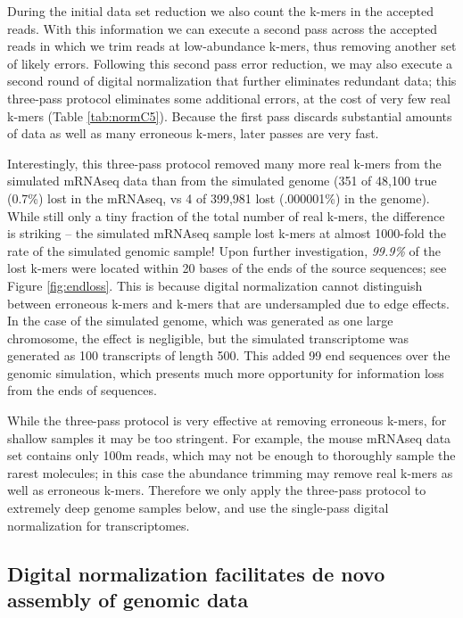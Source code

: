 \documentclass[10pt]{article}
\begin{document}
During the initial data set reduction we also count the k-mers in the
accepted reads.  With this information we can execute a second pass
across the accepted reads in which we trim reads at low-abundance
k-mers, thus removing another set of likely errors.  Following this
second pass error reduction, we may also execute a second round of
digital normalization that further eliminates redundant data; this
three-pass protocol eliminates some additional errors, at the cost
of very few real k-mers (Table \ref{tab:normC5}).  Because the first
pass discards substantial amounts of data as well as many erroneous
k-mers, later passes are very fast.

Interestingly, this three-pass protocol removed many more real k-mers
from the simulated mRNAseq data than from the simulated genome (351 of
48,100 true (0.7\%) lost in the mRNAseq, vs 4 of 399,981 lost
(.000001\%) in the genome).  While still only a tiny fraction of the total number of
real k-mers, the difference is striking -- the simulated mRNAseq sample lost
k-mers at almost 1000-fold the rate of the simulated genomic sample!  Upon further
investigation, {\em 99.9\%} of the lost k-mers were located within 20
bases of the ends of the source sequences; see Figure \ref{fig:endloss}.  This is
because digital normalization cannot distinguish between erroneous
k-mers and k-mers that are undersampled due to edge effects.  In the
case of the simulated genome, which was generated as one large
chromosome, the effect is negligible, but the simulated transcriptome
was generated as 100 transcripts of length 500.  This added 99 end sequences
over the genomic simulation, which presents much
more opportunity for information loss from the ends of sequences.

While the three-pass protocol is very effective at removing erroneous k-mers,
for shallow samples it may be too stringent.  For example, the mouse
mRNAseq data set contains only 100m reads, which may not be enough to
thoroughly sample the rarest molecules; in this case the abundance trimming
may remove real k-mers as well as erroneous k-mers.  Therefore we only
apply the three-pass protocol to extremely deep genome samples below,
and use the single-pass digital normalization for transcriptomes.

\subsection*{Digital normalization facilitates de novo assembly of genomic data}
\end{document}

